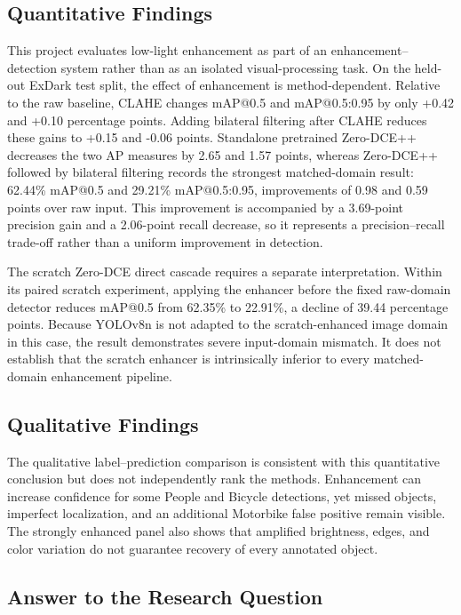\documentclass[11pt,a4paper]{article}
\begin{document}
\subsection{Quantitative Findings}

This project evaluates low-light enhancement as part of an
enhancement--detection system rather than as an isolated visual-processing
task. On the held-out ExDark test split, the effect of enhancement is
method-dependent. Relative to the raw baseline, CLAHE changes mAP@0.5 and
mAP@0.5:0.95 by only +0.42 and +0.10 percentage points. Adding bilateral
filtering after CLAHE reduces these gains to +0.15 and -0.06 points. Standalone
pretrained Zero-DCE++ decreases the two AP measures by 2.65 and 1.57 points,
whereas Zero-DCE++ followed by bilateral filtering records the strongest
matched-domain result: 62.44\% mAP@0.5 and 29.21\% mAP@0.5:0.95, improvements
of 0.98 and 0.59 points over raw input. This improvement is accompanied by a
3.69-point precision gain and a 2.06-point recall decrease, so it represents a
precision--recall trade-off rather than a uniform improvement in detection.

The scratch Zero-DCE direct cascade requires a separate interpretation. Within
its paired scratch experiment, applying the enhancer before the fixed
raw-domain detector reduces mAP@0.5 from 62.35\% to 22.91\%, a decline of 39.44
percentage points. Because YOLOv8n is not adapted to the scratch-enhanced image
domain in this case, the result demonstrates severe input-domain mismatch. It
does not establish that the scratch enhancer is intrinsically inferior to every
matched-domain enhancement pipeline.

\subsection{Qualitative Findings}

The qualitative label--prediction comparison is consistent with this
quantitative conclusion but does not independently rank the methods.
Enhancement can increase confidence for some People and Bicycle detections, yet
missed objects, imperfect localization, and an additional Motorbike false
positive remain visible. The strongly enhanced panel also shows that amplified
brightness, edges, and color variation do not guarantee recovery of every
annotated object.

\subsection{Answer to the Research Question}
\end{document}
